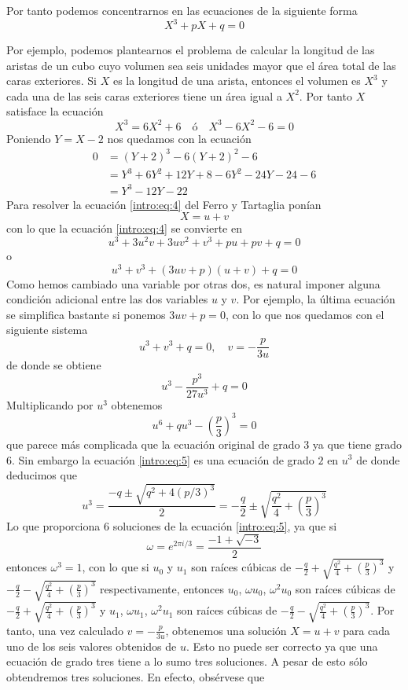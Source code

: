 Por tanto podemos concentrarnos en las ecuaciones de la siguiente forma
\begin{equation}\label{intro:eq:4}
    X^3+pX+q=0
\end{equation}

Por ejemplo, podemos plantearnos el problema de calcular la longitud de las aristas de un cubo cuyo volumen sea seis unidades mayor que el área total de las caras exteriores. Si $X$ es la longitud de una arista, entonces el volumen es $X^3$ y cada una de las seis caras exteriores tiene un área igual a $X^2$. Por tanto $X$ satisface la ecuación
$$X^3=6X^2+6\quad\text{ó}\quad X^3-6X^2-6=0$$
Poniendo $Y=X-2$ nos quedamos con la ecuación
\begin{equation*}
    \begin{split}
        0 & = (Y+2)^3 - 6(Y+2)^2 - 6 \\
          & = Y^3 + 6Y^2 + 12Y + 8 - 6Y^2 - 24Y - 24 - 6 \\
          & = Y^3 -12Y - 22
    \end{split}
\end{equation*}
Para resolver la ecuación \ref{intro:eq:4} del Ferro y Tartaglia ponían
$$X=u+v$$
con lo que la ecuación \ref{intro:eq:4} se convierte en
$$u^3+3u^2v+3uv^2+v^3+pu+pv+q=0$$
o
$$u^3+v^3+(3uv+p)(u+v)+q=0$$
Como hemos cambiado una variable por otras dos, es natural imponer alguna condición adicional entre las dos variables $u$ y $v$. Por ejemplo, la última ecuación se simplifica bastante si ponemos $3uv+p=0$, con lo que nos quedamos con el siguiente sistema
$$u^3+v^3+q=0, \quad v=-\frac{p}{3u}$$
de donde se obtiene
$$u^3-\frac{p^3}{27u^3}+q=0$$
Multiplicando por $u^3$ obtenemos
\begin{equation}\label{intro:eq:5}
    u^6+qu^3-\left(\frac{p}{3}\right)^3=0
\end{equation}
que parece más complicada que la ecuación original de grado $3$ ya que tiene grado $6$. Sin embargo la ecuación \ref{intro:eq:5} es una ecuación de grado $2$ en $u^3$ de donde deducimos que
$$u^3=\frac{-q\pm\sqrt{q^2+4(p/3)^3}}{2}=-\frac{q}{2}\pm\sqrt{\frac{q^2}{4}+\left(\frac{p}{3}\right)^3}$$
Lo que proporciona $6$ soluciones de la ecuación \ref{intro:eq:5}, ya que si
$$\omega=e^{2\pi i/3}=\frac{-1+\sqrt{-3}}{2}$$
entonces $\omega^3=1$, con lo que si $u_0$ y $u_1$ son raíces cúbicas de $-\frac{q}{2}+\sqrt{\frac{q^2}{4}+\left(\frac{p}{3}\right)^3}$ y $-\frac{q}{2}-\sqrt{\frac{q^2}{4}+\left(\frac{p}{3}\right)^3}$ respectivamente, entonces $u_0$, $\omega u_0$, $\omega^2 u_0$ son raíces cúbicas de $-\frac{q}{2}+\sqrt{\frac{q^2}{4}+\left(\frac{p}{3}\right)^3}$ y $u_1$, $\omega u_1$, $\omega^2 u_1$ son raíces cúbicas de $-\frac{q}{2}-\sqrt{\frac{q^2}{4}+\left(\frac{p}{3}\right)^3}$. Por tanto, una vez calculado $v=-\frac{p}{3u}$, obtenemos una solución $X=u+v$ para cada uno de los seis valores obtenidos de $u$. Esto no puede ser correcto ya que una ecuación de grado tres tiene a lo sumo tres soluciones. A pesar de esto sólo obtendremos tres soluciones. En efecto, obsérvese que
